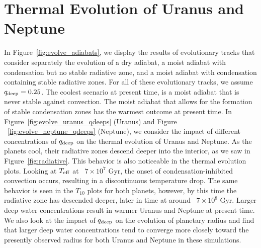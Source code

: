 \documentclass[11pt]{ucscthesisbs}
\begin{document}
\section{Thermal Evolution of Uranus and Neptune}

In Figure~\ref{fig:evolve_adiabats}, we display the results of evolutionary tracks that consider separately the evolution of a dry adiabat, a moist adiabat with condensation but no stable radiative zone, and a moist adiabat with condensation containing stable radiative zones. For all of these evolutionary tracks, we assume $q_{\rm deep} = 0.25$. The coolest scenario at present time, is a moist adiabat that is never stable against convection. The moist adiabat that allows for the formation of stable condensation zones has the warmest outcome at present time. In Figure~\ref{fig:evolve_uranus_qdeeps} (Uranus) and Figure ~\ref{fig:evolve_neptune_qdeeps} (Neptune), we consider the impact of different concentrations of $q_{\rm deep}$ on the thermal evolution of Uranus and Neptune. As the planets cool, their radiative zones descend deeper into the interior, as we saw in Figure~\ref{fig:radiative}. This behavior is also noticeable in the thermal evolution plots. Looking at $T_{\rm eff}$ at ~$7 \times 10^7$ Gyr, the onset of condensation-inhibited convection occurs, resulting in a discontinuous temperature drop. The same behavior is seen in the $T_{10}$ plots for both planets, however, by this time the radiative zone has descended deeper, later in time at around ~$7 \times 10^8$ Gyr. Larger deep water concentrations result in warmer Uranus and Neptune at present time. We also look at the impact of $q_{\rm deep}$ on the evolution of planetary radius and find that larger deep water concentrations tend to converge more closely toward the presently observed radius for both Uranus and Neptune in these simulations. 
\end{document}
